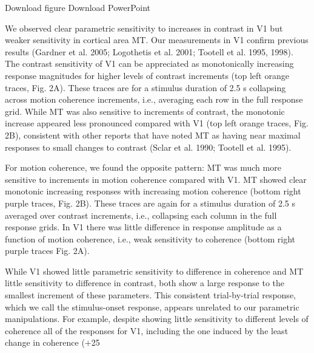 \documentclass{report}
\begin{document}
Download figure Download PowerPoint

We observed clear parametric sensitivity to increases in contrast in V1 but weaker sensitivity in cortical area MT. Our measurements in V1 confirm previous results (Gardner et al. 2005; Logothetis et al. 2001; Tootell et al. 1995, 1998). The contrast sensitivity of V1 can be appreciated as monotonically increasing response magnitudes for higher levels of contrast increments (top left orange traces, Fig. 2A). These traces are for a stimulus duration of 2.5 s collapsing across motion coherence increments, i.e., averaging each row in the full response grid. While MT was also sensitive to increments of contrast, the monotonic increase appeared less pronounced compared with V1 (top left orange traces, Fig. 2B), consistent with other reports that have noted MT as having near maximal responses to small changes to contrast (Sclar et al. 1990; Tootell et al. 1995).

For motion coherence, we found the opposite pattern: MT was much more sensitive to increments in motion coherence compared with V1. MT showed clear monotonic increasing responses with increasing motion coherence (bottom right purple traces, Fig. 2B). These traces are again for a stimulus duration of 2.5 s averaged over contrast increments, i.e., collapsing each column in the full response grids. In V1 there was little difference in response amplitude as a function of motion coherence, i.e., weak sensitivity to coherence (bottom right purple traces Fig. 2A).

While V1 showed little parametric sensitivity to difference in coherence and MT little sensitivity to difference in contrast, both show a large response to the smallest increment of these parameters. This consistent trial-by-trial response, which we call the stimulus-onset response, appears unrelated to our parametric manipulations. For example, despite showing little sensitivity to different levels of coherence all of the responses for V1, including the one induced by the least change in coherence (+25%
\end{document}
